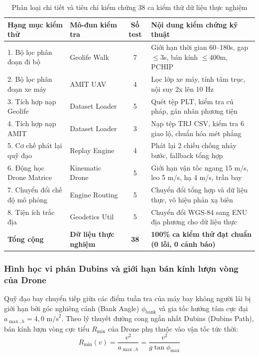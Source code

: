 \begin{table}[H]
\centering
\caption{Phân loại chi tiết và tiêu chí kiểm chứng 38 ca kiểm thử dữ liệu thực nghiệm}
\label{tab:38-real-data-tests-breakdown}
\begin{tabularx}{\linewidth}{llc>{\RaggedRight}X}
\toprule
\textbf{Hạng mục kiểm thử} & \textbf{Mô-đun kiểm tra} & \textbf{Số test} & \textbf{Nội dung kiểm chứng kỹ thuật} \\
\midrule
1. Bộ lọc phân đoạn đi bộ & Geolife Walk & 7 & Giới hạn thời gian 60--180s, gap $\le 3$s, bán kính $\le 400$m, PCHIP \\
2. Bộ lọc phân đoạn xe máy & AMIT UAV & 4 & Lọc lớp xe máy, tính tâm trục, nội suy 2x lên 10 Hz \\
3. Tích hợp nạp Geolife & Dataset Loader & 5 & Quét tệp PLT, kiểm tra cú pháp, gán nhãn phương tiện \\
4. Tích hợp nạp AMIT & Dataset Loader & 3 & Nạp tệp TRJ CSV, kiểm tra 6 giao lộ, chuẩn hóa mét phẳng \\
5. Cơ chế phát lại quỹ đạo & Replay Engine & 4 & Phát lại 2 chiều chống nhảy bước, fallback tổng hợp \\
6. Động học Drone Matrice & Kinematic Drone & 5 & Giới hạn vận tốc ngang 15 m/s, leo 5 m/s, hạ 4 m/s, trần bay \\
7. Chuyển đổi chế độ mô phỏng & Engine Routing & 5 & Chuyển đổi tổng hợp và dữ liệu thực, vô hiệu phản xạ biên \\
8. Tiện ích trắc địa & Geodetics Util & 5 & Chuyển đổi WGS-84 sang ENU địa phương cho dữ liệu thực \\
\midrule
\textbf{Tổng cộng} & \textbf{Dữ liệu thực nghiệm} & \textbf{38} & \textbf{100\% ca kiểm thử đạt chuẩn (0 lỗi, 0 cảnh báo)} \\
\bottomrule
\end{tabularx}
\end{table}

\subsubsection{Hình học vi phân Dubins và giới hạn bán kính lượn vòng của Drone}

\hspace{0.5cm} Quỹ đạo bay chuyển tiếp giữa các điểm tuần tra của máy bay không người lái bị giới hạn bởi góc nghiêng cánh (Bank Angle) $\phi_{\text{bank}}$ và gia tốc hướng tâm cực đại $a_{\max, h} = 4{,}0\text{ m/s}^2$. Theo lý thuyết đường cong ngắn nhất Dubins (Dubins Path), bán kính lượn vòng cực tiểu $R_{\min}$ của Drone phụ thuộc vào vận tốc tức thời:
\begin{equation}
R_{\min}(v) = \frac{v^2}{a_{\max, h}} = \frac{v^2}{g \tan\phi_{\max}}
\label{eq:dubins-min-radius}
\end{equation}

